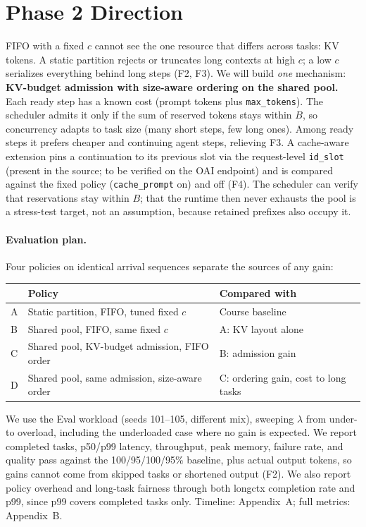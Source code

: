 \documentclass{article}
\begin{document}
\section{Phase 2 Direction}
\label{sec:phase2}
FIFO with a fixed $c$ cannot see the one resource that differs across tasks: KV tokens. A static partition rejects or truncates long contexts at high $c$; a low $c$ serializes everything behind long steps (F2, F3). We will build \emph{one} mechanism: \textbf{KV-budget admission with size-aware ordering on the shared pool.} Each ready step has a known cost (prompt tokens plus \texttt{max\_tokens}). The scheduler admits it only if the sum of reserved tokens stays within $B$, so concurrency adapts to task size (many short steps, few long ones). Among ready steps it prefers cheaper and continuing agent steps, relieving F3. A cache-aware extension pins a continuation to its previous slot via the request-level \texttt{id\_slot} (present in the source; to be verified on the OAI endpoint) and is compared against the fixed policy (\texttt{cache\_prompt} on) and off (F4). The scheduler can verify that reservations stay within $B$; that the runtime then never exhausts the pool is a stress-test target, not an assumption, because retained prefixes also occupy it.

\paragraph{Evaluation plan.} Four policies on identical arrival sequences separate the sources of any gain:

\begin{center}
\footnotesize
\begin{tabular}{@{}lp{1.62in}p{0.98in}@{}}
\toprule
& Policy & Compared with \\
\midrule
A & Static partition, FIFO, tuned fixed $c$ & Course baseline \\
B & Shared pool, FIFO, same fixed $c$ & A: KV layout alone \\
C & Shared pool, KV-budget admission, FIFO order & B: admission gain \\
D & Shared pool, same admission, size-aware order & C: ordering gain, cost to long tasks \\
\bottomrule
\end{tabular}
\end{center}

We use the Eval workload (seeds 101--105, different mix), sweeping $\lambda$ from under- to overload, including the underloaded case where no gain is expected. We report completed tasks, p50/p99 latency, throughput, peak memory, failure rate, and quality pass against the 100/95/100/95\% baseline, plus actual output tokens, so gains cannot come from skipped tasks or shortened output (F2). We also report policy overhead and long-task fairness through both longctx completion rate and p99, since p99 covers completed tasks only. Timeline: Appendix~A; full metrics: Appendix~B.
\end{document}
